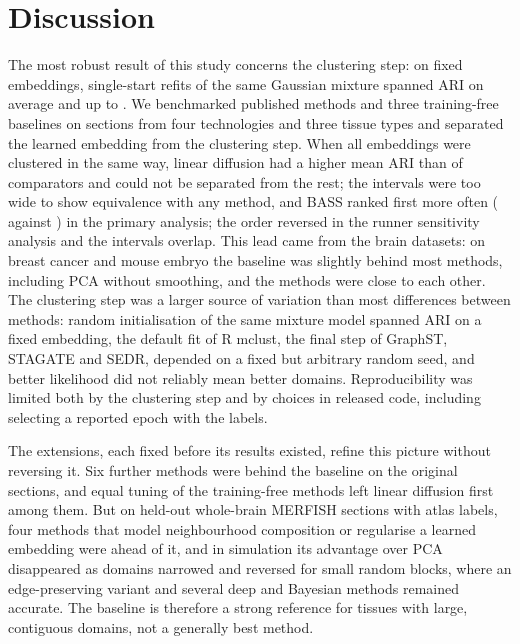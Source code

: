 \documentclass[unnumsec,webpdf,contemporary,large]{oup-authoring-template}
\begin{document}
\section{Discussion}
The most robust result of
this study concerns the clustering step: on \lotN{} fixed embeddings, single-start refits of the same Gaussian mixture spanned \lotMean{} ARI on
average and up to \lotMax. We benchmarked \nMethodsPub{} published methods and three training-free baselines on \nSections{} sections from four
technologies and three tissue types and separated the learned embedding from the clustering step. When all embeddings were
clustered in the same way, linear diffusion had a higher mean ARI than \nRobBetter{} of \nRobTot{} comparators and
could not be separated from the rest; the intervals were too wide to show equivalence with any method, and BASS ranked first more often (\pBestBass{} against \pBestLin) in the primary analysis; the order reversed in the runner sensitivity analysis and the intervals overlap. This lead
came from the brain datasets: on breast cancer and mouse embryo the baseline was slightly behind most methods, including PCA without
smoothing, and the methods were close to each other. The clustering step was a larger source of
variation than most differences between methods: random initialisation of the same mixture model spanned \lotMean{} ARI on a fixed
embedding, the default fit of R mclust, the final step of GraphST, STAGATE and SEDR, depended on a fixed but arbitrary random seed, and
better likelihood did not reliably mean better domains. Reproducibility was limited both by the clustering step and by choices in
released code, including selecting a reported epoch with the labels.

The extensions, each fixed before its results existed, refine this picture without reversing it. Six further methods were behind the
baseline on the original sections, and equal tuning of the training-free methods left linear diffusion first among them. But on held-out
whole-brain MERFISH sections with atlas labels, four methods that model neighbourhood composition or regularise a learned embedding were
ahead of it, and in simulation its advantage over PCA disappeared as domains narrowed and reversed for small random blocks, where an
edge-preserving variant and several deep and Bayesian methods remained accurate. The baseline is therefore a strong reference for tissues
with large, contiguous domains, not a generally best method.
\end{document}
